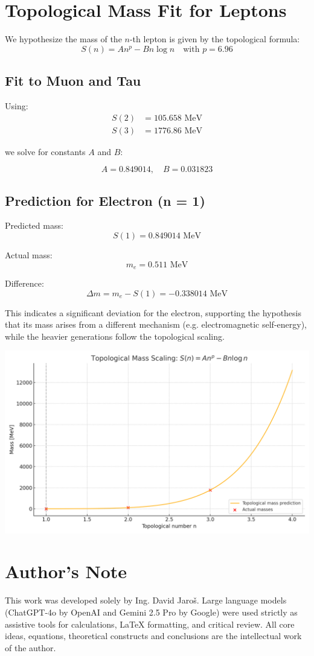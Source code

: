 \documentclass{article}
\begin{document}
\section*{Topological Mass Fit for Leptons}

We hypothesize the mass of the $n$-th lepton is given by the topological formula:
\[
S(n) = A n^p - B n \log n \quad \text{with } p = 6.96
\]

\subsection*{Fit to Muon and Tau}

Using:
\begin{align*}
S(2) &= 105.658 \text{ MeV} \\
S(3) &= 1776.86 \text{ MeV}
\end{align*}

we solve for constants $A$ and $B$:

\[
A = 0.849014, \quad B = 0.031823
\]

\subsection*{Prediction for Electron (n = 1)}

Predicted mass:
\[
S(1) = 0.849014 \text{ MeV}
\]

Actual mass:
\[
m_e = 0.511 \text{ MeV}
\]

Difference:
\[
\Delta m = m_e - S(1) = -0.338014 \text{ MeV}
\]

This indicates a significant deviation for the electron, supporting the hypothesis that its mass arises from a different mechanism (e.g. electromagnetic self-energy), while the heavier generations follow the topological scaling.

\includegraphics[width=\linewidth]{topological_mass_fit.png}


\section*{Author's Note}

This work was developed solely by Ing. David Jaroš.  
Large language models (ChatGPT-4o by OpenAI and Gemini 2.5 Pro by Google) were used strictly as assistive tools for calculations, LaTeX formatting, and critical review.  
All core ideas, equations, theoretical constructs and conclusions are the intellectual work of the author.
\end{document}
